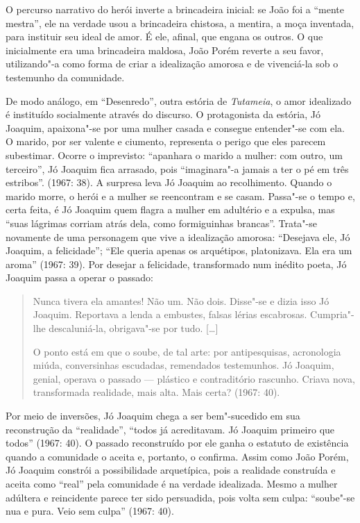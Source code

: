 {O percurso narrativo do herói inverte a brincadeira inicial: se João
foi a “mente mestra”, ele na verdade usou a brincadeira chistosa, a
mentira, a moça inventada, para instituir seu ideal de amor. É ele,
afinal, que engana os outros. O que inicialmente era uma brincadeira
maldosa, João Porém reverte a seu favor, utilizando"-a como forma de
criar a idealização amorosa e de vivenciá-la sob o testemunho da
comunidade.

De modo análogo, em “Desenredo”, outra estória de
\emph{Tutameia}, o amor idealizado é instituído socialmente através
do discurso. O protagonista da estória, Jó Joaquim, apaixona"-se por
uma mulher casada e consegue entender"-se com ela. O marido, por ser
valente e ciumento, representa o perigo que eles parecem subestimar.
Ocorre o imprevisto: “apanhara o marido a mulher: com outro, um
terceiro”, Jó Joaquim fica arrasado, pois “imaginara"-a jamais a ter o
pé em três estribos”. (1967: 38). A surpresa leva Jó Joaquim ao
recolhimento. Quando o marido morre, o herói e a mulher se
reencontram e se casam. Passa"-se o tempo e, certa feita, é Jó Joaquim
quem flagra a mulher em adultério e a expulsa, mas “suas lágrimas
corriam atrás dela, como formiguinhas brancas”. Trata"-se novamente de
uma personagem que vive a idealização amorosa: “Desejava ele, Jó
Joaquim, a felicidade”; “Ele queria apenas os arquétipos,
platonizava. Ela era um aroma” (1967: 39). Por desejar a felicidade,
transformado num inédito poeta, Jó Joaquim passa a operar o passado:

\begin{quote}
Nunca tivera ela amantes! Não um. Não dois. Disse"-se e dizia isso
Jó Joaquim. Reportava a lenda a embustes, falsas lérias escabrosas.
Cumpria"-lhe descaluniá-la, obrigava"-se por tudo. [\ldots{}]

O ponto está em que o soube, de tal arte: por antipesquisas,
acronologia miúda, conversinhas escudadas, remendados testemunhos. Jó
Joaquim, genial, operava o passado --- plástico e contraditório
rascunho. Criava nova, transformada realidade, mais alta. Mais certa?
(1967: 40).
\end{quote}

Por meio de inversões, Jó Joaquim chega a ser bem"-sucedido em sua
reconstrução da “realidade”, “todos já acreditavam. Jó Joaquim
primeiro que todos” (1967: 40). O passado reconstruído por ele ganha
o estatuto de existência quando a comunidade o aceita e, portanto, o
confirma. Assim como João Porém, Jó Joaquim constrói a possibilidade
arquetípica, pois a realidade construída e aceita como “real” pela
comunidade é na verdade idealizada. Mesmo a mulher adúltera e
reincidente parece ter sido persuadida, pois volta sem culpa:
“soube"-se nua e pura. Veio sem culpa” (1967: 40).

}
